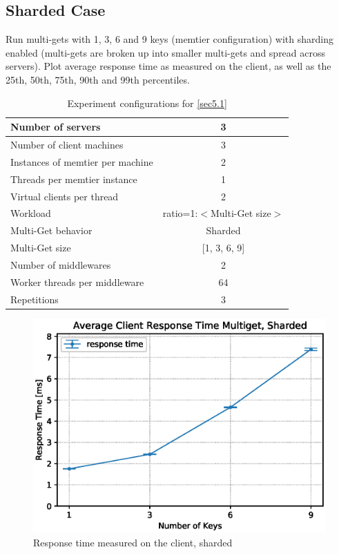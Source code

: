 \documentclass[11pt,a4paper]{article}
\begin{document}
\subsection{Sharded Case} \label{sec5.1}

Run multi-gets with 1, 3, 6 and 9 keys (memtier configuration) with sharding enabled (multi-gets are broken up into smaller multi-gets and spread across servers). Plot average response time as measured on the client, as well as the 25th, 50th, 75th, 90th and 99th percentiles.

\begin{center}
    \begin{table}
        \centering
    	\begin{tabular}{|l|c|}
    		\hline Number of servers                & 3                       \\ 
    		\hline Number of client machines        & 3                       \\ 
    		\hline Instances of memtier per machine & 2                       \\ 
    		\hline Threads per memtier instance     & 1                       \\
    		\hline Virtual clients per thread       & 2     		            \\ 
    		\hline Workload                         & ratio=1:$<$Multi-Get size$>$             \\
    		\hline Multi-Get behavior               & Sharded                 \\
    		\hline Multi-Get size                   & [1, 3, 6, 9]            \\
    		\hline Number of middlewares            & 2                       \\
    		\hline Worker threads per middleware    & 64                      \\
    		\hline Repetitions                      & 3                       \\ 
    		\hline 
    	\end{tabular}
    	\caption{Experiment configurations for \autoref{sec5.1}} \label{exp5-1}
    \end{table}
\end{center}

\begin{figure}
    \centering
    \includegraphics[width=0.7\linewidth]{plots/5a_latencyMemtier.eps}
    \caption{Response time measured on the client, sharded}
    \label{fig:5-1-responsetime}
\end{figure}
\end{document}
